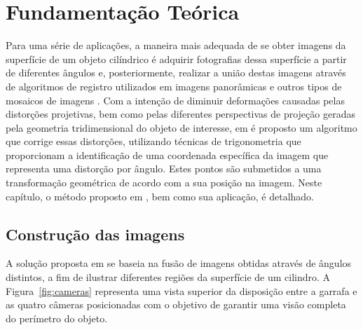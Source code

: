 \chapter{Fundamentação Teórica}

Para uma série de aplicações, a maneira mais adequada de se obter imagens da superfície de um objeto cilíndrico é adquirir fotografias dessa superfície a partir de diferentes ângulos e, posteriormente, realizar a união destas imagens através de algoritmos de registro utilizados em imagens panorâmicas e outros tipos de mosaicos de imagens \cite{Park:2013}. 
Com a intenção de diminuir deformações causadas pelas distorções projetivas, bem como pelas diferentes perspectivas de projeção geradas pela geometria tridimensional do objeto de interesse, em \cite{Lin:2013} é proposto um algoritmo que corrige essas distorções, utilizando técnicas de trigonometria que proporcionam a identificação de uma coordenada específica da imagem  que representa uma distorção por ângulo. Estes pontos são submetidos a uma transformação geométrica de acordo com a sua posição na imagem.  Neste capítulo, o método proposto em \cite{Lin:2013}, bem como sua aplicação, é detalhado.

\section{Construção das imagens}

A solução proposta em \cite{Lin:2013} se baseia na fusão de imagens obtidas através de ângulos distintos, a fim de ilustrar diferentes regiões da superfície de um cilindro. A Figura~\ref{fig:cameras} representa uma vista superior da disposição entre a garrafa e as quatro câmeras posicionadas com o objetivo de garantir uma visão completa do perímetro do objeto.  

